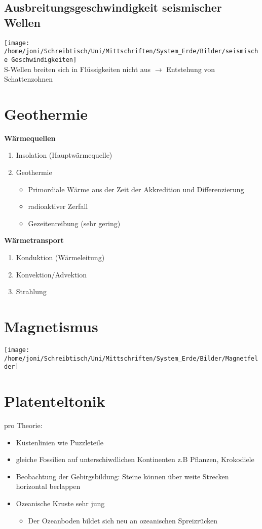 \documentclass[a4,12pt]{scrreprt}
\begin{document}
\subsection{Ausbreitungsgeschwindigkeit seismischer Wellen}

\texttt{[image: /home/joni/Schreibtisch/Uni/Mittschriften/System\_Erde/Bilder/seismische Geschwindigkeiten]}\\

S-Wellen breiten sich in Flüssigkeiten nicht aus $\rightarrow$ Entstehung von Schattenzohnen

\section{Geothermie}

\textbf{Wärmequellen}
\begin{enumerate}
\item Insolation (Hauptwärmequelle)
\item Geothermie 
\begin{itemize}
\item Primordiale Wärme aus der Zeit der Akkredition und Differenzierung
\item radioaktiver Zerfall
\item Gezeitenreibung (sehr gering)
\end{itemize}
\end{enumerate}

\textbf{Wärmetransport}
\begin{enumerate}
\item Konduktion (Wärmeleitung)
\item Konvektion/Advektion
\item Strahlung
\end{enumerate}

\section{Magnetismus}

\texttt{[image: /home/joni/Schreibtisch/Uni/Mittschriften/System\_Erde/Bilder/Magnetfelder]}\\

\section{Platenteltonik}
pro Theorie:
\begin{itemize}
\item Küstenlinien wie Puzzleteile
\item gleiche Fossilien auf unterschiwdlichen Kontinenten z.B Pflanzen, Krokodiele
\item Beobachtung der Gebirgsbildung: Steine können über weite Strecken horizontal berlappen
\item Ozeanische Kruste sehr jung
\begin{itemize}
\item Der Ozeanboden bildet sich neu an ozeanischen Spreizrücken
\end{itemize}
\end{itemize}
\end{document}
